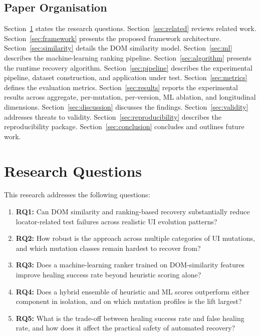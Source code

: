 \documentclass[12pt]{article}
\begin{document}
\subsection{Paper Organisation}

Section~\ref{sec:rq} states the research questions. Section~\ref{sec:related} reviews related work. Section~\ref{sec:framework} presents the proposed framework architecture. Section~\ref{sec:similarity} details the DOM similarity model. Section~\ref{sec:ml} describes the machine-learning ranking pipeline. Section~\ref{sec:algorithm} presents the runtime recovery algorithm. Section~\ref{sec:pipeline} describes the experimental pipeline, dataset construction, and application under test. Section~\ref{sec:metrics} defines the evaluation metrics. Section~\ref{sec:results} reports the experimental results across aggregate, per-mutation, per-version, ML ablation, and longitudinal dimensions. Section~\ref{sec:discussion} discusses the findings. Section~\ref{sec:validity} addresses threats to validity. Section~\ref{sec:reproducibility} describes the reproducibility package. Section~\ref{sec:conclusion} concludes and outlines future work.

\section{Research Questions}
\label{sec:rq}

This research addresses the following questions:

\begin{enumerate}[leftmargin=1.2em]
    \item \textbf{RQ1:} Can DOM similarity and ranking-based recovery substantially reduce locator-related test failures across realistic UI evolution patterns?
    \item \textbf{RQ2:} How robust is the approach across multiple categories of UI mutations, and which mutation classes remain hardest to recover from?
    \item \textbf{RQ3:} Does a machine-learning ranker trained on DOM-similarity features improve healing success rate beyond heuristic scoring alone?
    \item \textbf{RQ4:} Does a hybrid ensemble of heuristic and ML scores outperform either component in isolation, and on which mutation profiles is the lift largest?
    \item \textbf{RQ5:} What is the trade-off between healing success rate and false healing rate, and how does it affect the practical safety of automated recovery?
\end{enumerate}
\end{document}
